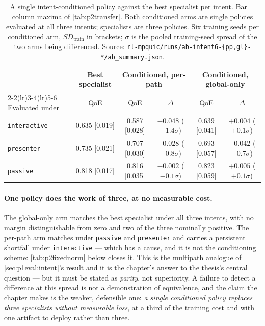 \begin{table}[t]
  \centering
  \caption[One conditioned policy against the best specialist per intent]{A single intent-conditioned policy against the best specialist per intent. Bar = column
  maxima of \cref{tab:p2transfer}. Both conditioned arms are single policies evaluated at all three
  intents; specialists are three policies. Six training seeds per conditioned arm,
  $\mathit{SD}_{\mathrm{train}}$ in brackets; $\sigma$ is the pooled training-seed spread of the two
  arms being differenced. Source: \texttt{rl-mpquic/runs/ab-intent6-\{pp,gl\}-*/ab\_summary.json}.}
  \label{tab:p2intent}
  \small
  \setlength{\tabcolsep}{4pt}
  \begin{tabular}{lccccc}
    \toprule
    & \multicolumn{1}{c}{Best specialist} & \multicolumn{2}{c}{Conditioned, per-path} & \multicolumn{2}{c}{Conditioned, global-only} \\
    \cmidrule(lr){2-2}\cmidrule(lr){3-4}\cmidrule(lr){5-6}
    Evaluated under & QoE & QoE & $\Delta$ & QoE & $\Delta$ \\
    \midrule
    \texttt{interactive} & 0.635 [0.019] & 0.587 [0.028] & $-0.048$ ($-1.4\sigma$) & 0.639 [0.041] & $+0.004$ ($+0.1\sigma$) \\
    \texttt{presenter}   & 0.735 [0.021] & 0.707 [0.030] & $-0.028$ ($-0.8\sigma$) & 0.693 [0.057] & $-0.042$ ($-0.7\sigma$) \\
    \texttt{passive}     & 0.818 [0.017] & 0.816 [0.035] & $-0.002$ ($-0.1\sigma$) & 0.823 [0.059] & $+0.005$ ($+0.1\sigma$) \\
    \bottomrule
  \end{tabular}
\end{table}

\paragraph{One policy does the work of three, at no measurable cost.} The global-only arm matches the
best specialist under all three intents, with no margin distinguishable from zero and two of the three
nominally positive. The per-path arm matches under \texttt{passive} and \texttt{presenter} and carries a
persistent shortfall under \texttt{interactive} --- which has a cause, and it is not the conditioning
scheme: \cref{tab:p2fixednorm} below closes it. This is the multipath analogue of
\cref{sec:p1eval:intent}'s result and it is the chapter's answer to the thesis's central question --- but
it must be stated as \emph{parity}, not superiority. A failure to detect a difference at this spread is
not a demonstration of equivalence, and the claim the chapter makes is the weaker, defensible one:
\emph{a single conditioned policy replaces three specialists without measurable loss}, at a third of the
training cost and with one artifact to deploy rather than three.

